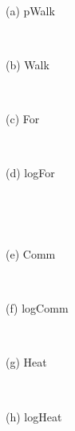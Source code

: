 \documentclass{article}
\begin{document}
\begin{figure}[H] %
	\begin{minipage}{.24\textwidth} %
		\\\centerline{(a) pWalk}
	\end{minipage}
	\begin{minipage}{.24\textwidth} %
		\\\centerline{(b) Walk}
	\end{minipage}
	\begin{minipage}{.24\textwidth} %
		\\\centerline{(c) For}
	\end{minipage}
	\begin{minipage}{.24\textwidth} %
		\\\centerline{(d) logFor}
	\end{minipage}
    \\[6pt]
	\begin{minipage}{.24\textwidth} %
		\\\centerline{(e) Comm}
	\end{minipage}
	\begin{minipage}{.24\textwidth} %
		\\\centerline{(f) logComm}
	\end{minipage}
	\begin{minipage}{.24\textwidth} %
		\\\centerline{(g) Heat}
	\end{minipage}
	\begin{minipage}{.24\textwidth} %
		\\\centerline{(h) logHeat}
	\end{minipage}
    \\[6pt]


\end{figure}
\end{document}

